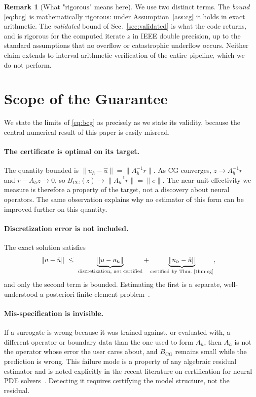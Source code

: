 \documentclass[journal]{IEEEtran}
\theoremstyle{plain}
\theoremstyle{definition}
\newtheorem{remark}{Remark}
\begin{document}
\begin{remark}[What "rigorous" means here]
We use two distinct terms. The \emph{bound} \eqref{eq:bcg} is mathematically rigorous:
under Assumption~\ref{ass:cg} it holds in exact arithmetic. The \emph{validated}
bound of Sec.~\ref{sec:validated} is what the code returns, and is rigorous for the
computed iterate $z$ in IEEE double precision, up to the standard assumptions that no
overflow or catastrophic underflow occurs. Neither claim extends to interval-arithmetic
verification of the entire pipeline, which we do not perform.
\end{remark}

\section{Scope of the Guarantee}\label{sec:scope}
We state the limits of \eqref{eq:bcg} as precisely as we state its validity, because
the central numerical result of this paper is easily misread.

\paragraph{The certificate is optimal on its target.}
The quantity bounded is $\|u_h-\hat u\|=\|A_h^{-1}r\|$. As CG converges, $z\to A_h^{-1}r$
and $r-A_hz\to0$, so $B_{\mathrm{CG}}(z)\to\|A_h^{-1}r\|=\|e\|$. The near-unit effectivity
we measure is therefore a property of the target, not a discovery about neural
operators. The same observation explains why no estimator of this form can be improved
further on this quantity.

\paragraph{Discretization error is not included.}
The exact solution satisfies
\begin{equation}
\|u-\hat u\|\ \le\ \underbrace{\|u-u_h\|}_{\text{discretization, not certified}}
+\underbrace{\|u_h-\hat u\|}_{\text{certified by Thm.~\ref{thm:cg}}},
\label{eq:split}
\end{equation}
and only the second term is bounded. Estimating the first is a separate, well-understood
a posteriori finite-element problem~\cite{ainsworth2000posteriori,verfurth2013posteriori}.

\paragraph{Mis-specification is invisible.}
If a surrogate is wrong because it was trained against, or evaluated with, a different
operator or boundary data than the one used to form $A_h$, then $A_h$ is not the
operator whose error the user cares about, and $B_{\mathrm{CG}}$ remains small while the
prediction is wrong. This failure mode is a property of any algebraic residual
estimator and is noted explicitly in the recent literature on certification for neural
PDE solvers~\cite{mukherjee2026rigorous}. Detecting it requires certifying the model
structure, not the residual.
\end{document}
